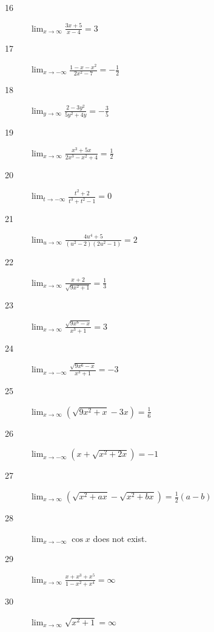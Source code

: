 \documentclass[letterpaper, landscape]{exam}
\begin{document}
\begin{description}
      \item[16] 
        $\lim_{x \to \infty} \frac{3x + 5}{x - 4} = \boxed{ 3 }$

      \item[17] 
        $\lim_{x \to -\infty} \frac{1 - x - x^2}{2x^2 - 7} = \boxed{ - \frac{1}{2} }$

      \item[18] 
        $\lim_{y \to \infty} \frac{2 - 3y^2}{5y^2 + 4y} = \boxed{ - \frac{3}{5} }$

      \item[19] 
        $\lim_{x \to \infty} \frac{x^3 + 5x}{2x^3 - x^2 + 4} = \boxed{ \frac{1}{2} }$

      \item[20] 
        $\lim_{t \to -\infty} \frac{t^2 + 2}{t^3 + t^2 - 1} = \boxed{ 0 }$

      \item[21] 
        $\lim_{u \to \infty} \frac{4u^4 + 5}{\left(u^2 - 2 \right) \left(2u^2 - 1 \right)} 
          = \boxed{ 2 }$

      \item[22] 
        $\lim_{x \to \infty} \frac{x + 2}{\sqrt{9x^2 + 1}} = \boxed{ \frac{1}{3} }$

      \item[23] 
        $\lim_{x \to \infty} \frac{\sqrt{9x^6 - x}}{x^3 + 1} = \boxed{ 3 }$

      \item[24] 
        $\lim_{x \to -\infty} \frac{\sqrt{9x^6 - x}}{x^3 + 1} = \boxed{ -3 }$

      \item[25] 
        $\lim_{x \to \infty} \left( \sqrt{9x^2 + x} - 3x \right) 
          = \boxed{ \frac{1}{6} }$

      \item[26] 
        $\lim_{x \to -\infty} \left( x + \sqrt{x^2 + 2x} \right) = \boxed{ -1 }$

      \item[27] 
        $\lim_{x \to \infty} \left( \sqrt{x^2 + ax} - \sqrt{x^2 + bx} \right) 
          = \boxed{ \frac{1}{2} (a - b) }$

      \item[28] 
        $\lim_{x \to -\infty} \cos x$ does not exist.

      \item[29] 
        $\lim_{x \to \infty} \frac{x + x^3 + x^5}{1 - x^2 + x^4} = \boxed{ \infty }$

      \item[30] 
        $\lim_{x \to \infty} \sqrt{x^2 + 1} = \boxed{ \infty }$


\end{description}
\end{document}
